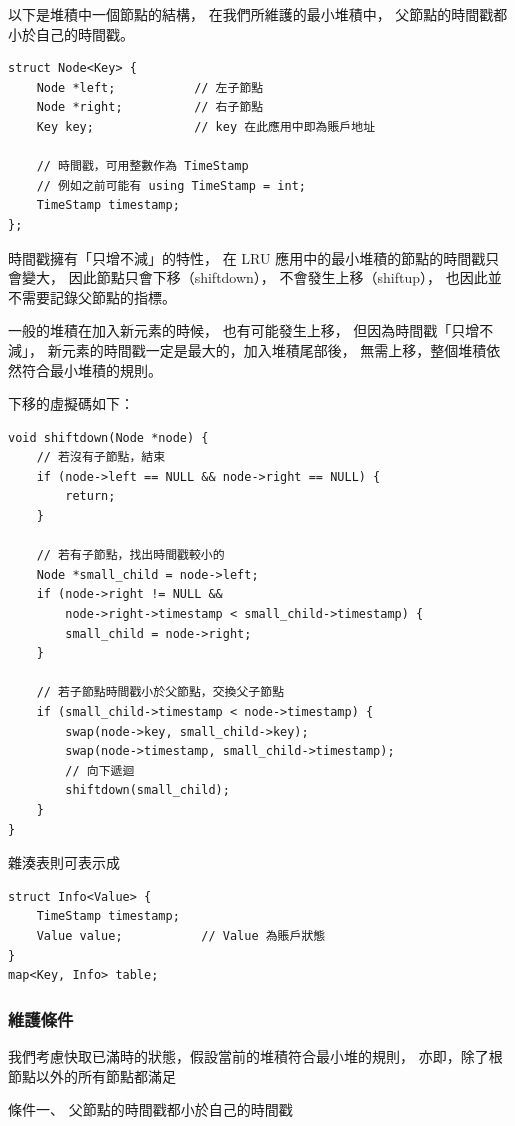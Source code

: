 以下是堆積中一個節點的結構，
在我們所維護的最小堆積中，
父節點的時間戳都小於自己的時間戳。

\begin{lstlisting}
struct Node<Key> {
    Node *left;           // 左子節點
    Node *right;          // 右子節點
    Key key;              // key 在此應用中即為賬戶地址

    // 時間戳，可用整數作為 TimeStamp
    // 例如之前可能有 using TimeStamp = int;
    TimeStamp timestamp;
};
\end{lstlisting}

時間戳擁有「只增不減」的特性，
在 LRU 應用中的最小堆積的節點的時間戳只會變大，
因此節點只會下移（shiftdown），
不會發生上移（shiftup），
也因此並不需要記錄父節點的指標。

一般的堆積在加入新元素的時候，
也有可能發生上移，
但因為時間戳「只增不減」，
新元素的時間戳一定是最大的，加入堆積尾部後，
無需上移，整個堆積依然符合最小堆積的規則。

下移的虛擬碼如下：

\begin{lstlisting}
void shiftdown(Node *node) {
    // 若沒有子節點，結束
    if (node->left == NULL && node->right == NULL) {
        return;
    }

    // 若有子節點，找出時間戳較小的
    Node *small_child = node->left;
    if (node->right != NULL &&
        node->right->timestamp < small_child->timestamp) {
        small_child = node->right;
    }

    // 若子節點時間戳小於父節點，交換父子節點
    if (small_child->timestamp < node->timestamp) {
        swap(node->key, small_child->key);
        swap(node->timestamp, small_child->timestamp);
        // 向下遞迴
        shiftdown(small_child);
    }
}
\end{lstlisting}

雜湊表則可表示成

\begin{lstlisting}
struct Info<Value> {
    TimeStamp timestamp;
    Value value;           // Value 為賬戶狀態
}
map<Key, Info> table;
\end{lstlisting}

\subsubsection{維護條件}
我們考慮快取已滿時的狀態，假設當前的堆積符合最小堆的規則，
亦即，除了根節點以外的所有節點都滿足

條件一、 父節點的時間戳都小於自己的時間戳

